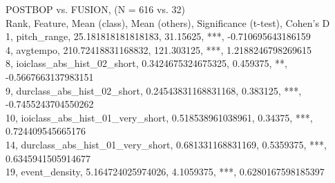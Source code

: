 POSTBOP vs. FUSION, (N = 616 vs. 32)\\
Rank, Feature, Mean (class), Mean (others), Significance (t-test), Cohen's D\\
1, pitch_range, 25.181818181818183, 31.15625, ***, -0.710695643186159\\
4, avgtempo, 210.72418831168832, 121.303125, ***, 1.2188246798269615\\
8, ioiclass_abs_hist_02_short, 0.3424675324675325, 0.459375, **, -0.5667663137983151\\
9, durclass_abs_hist_02_short, 0.24543831168831168, 0.383125, ***, -0.7455243704550262\\
10, ioiclass_abs_hist_01_very_short, 0.518538961038961, 0.34375, ***, 0.724409545665176\\
14, durclass_abs_hist_01_very_short, 0.681331168831169, 0.5359375, ***, 0.6345941505914677\\
19, event_density, 5.164724025974026, 4.1059375, ***, 0.6280167598185397\\
